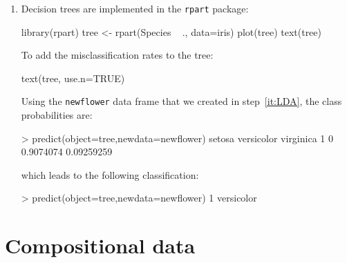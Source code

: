 \begin{enumerate}
Thus, according to QDA, there is a 76\% probability that the new
flower is \textit{versicolor}, and a 24\% chance that it is
\textit{virginica}.

\item Decision trees are implemented in the \texttt{rpart} package:

\begin{script}
library(rpart)
tree <- rpart(Species ~ ., data=iris)
plot(tree)
text(tree)
\end{script}

To add the misclassification rates to the tree:

\begin{script}[firstnumber=4]
text(tree, use.n=TRUE)
\end{script}

Using the \texttt{newflower} data frame that we created in
step~\ref{it:LDA}, the class probabilities are:

\begin{console}
> predict(object=tree,newdata=newflower)
  setosa versicolor  virginica
1      0  0.9074074 0.09259259
\end{console}

\noindent which leads to the following classification:

\begin{console}
> predict(object=tree,newdata=newflower)
         1 
versicolor 
\end{console}

\end{enumerate}
  
\section{Compositional data}
\label{sec:R-compositional}

